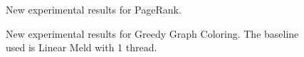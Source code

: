 \documentclass[10pt]{article}
\begin{document}
\begin{figure}[h]
\begin{center}
\end{center}
\caption{New experimental results for PageRank.}
\label{fig:res1}
\end{figure}

\begin{figure}[h]
\begin{center}
\end{center}
\caption{New experimental results for Greedy Graph Coloring. The baseline used
   is Linear Meld with 1 thread.}
\label{fig:res1}
\end{figure}
\end{document}
